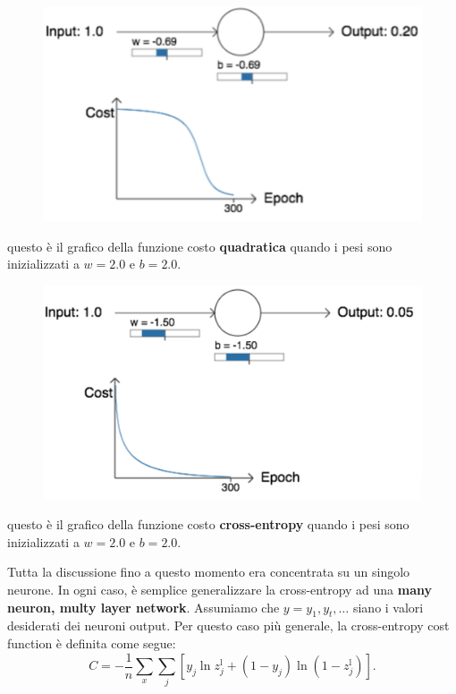 \begin{figure}[!h]
    \includegraphics[scale=.4]{images/best_practices/first_graph_ce.png}
    \centering
\end{figure}



questo è il grafico della funzione costo \textbf{quadratica} quando i pesi sono inizializzati a $w=2.0$ e $b=2.0$.



\begin{figure}[h]
    \includegraphics[scale=.4]{images/best_practices/second_graph_ce.png}
    \centering
\end{figure}


questo è il grafico della funzione costo \textbf{cross-entropy} quando i pesi sono inizializzati a $w=2.0$ e $b=2.0$.

Tutta la discussione fino a questo momento era concentrata su un singolo neurone. In ogni caso, è semplice generalizzare la cross-entropy ad una \textbf{many neuron, multy layer network}. Assumiamo che $y=y_1,y_t,\dots$ siano i valori desiderati dei neuroni output. Per questo caso più generale, la cross-entropy cost function è definita come segue:
\begin{equation}
    C=-\frac{1}{n}\sum_x\sum_j[y_j\ln{z_j^\text{l}}+(1-y_j)\ln{(1-z_j^\text{l})}].
\end{equation}

